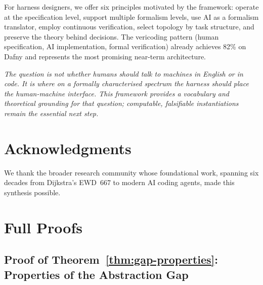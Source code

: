 \documentclass[11pt, a4paper, copyright]{googledeepmind}
\begin{document}
For harness designers, we offer six principles motivated by the framework: operate at the specification level, support multiple formalism levels, use AI as a formalism translator, employ continuous verification, select topology by task structure, and preserve the theory behind decisions. The vericoding pattern (human specification, AI implementation, formal verification) already achieves 82\% on Dafny and represents the most promising near-term architecture.

\emph{The question is not whether humans should talk to machines in English or in code. It is where on a formally characterised spectrum the harness should place the human-machine interface. This framework provides a vocabulary and theoretical grounding for that question; computable, falsifiable instantiations remain the essential next step.}


\section*{Acknowledgments}

We thank the broader research community whose foundational work, spanning six decades from Dijkstra's EWD~667 to modern AI coding agents, made this synthesis possible.









\clearpage


\appendix

\section{Full Proofs}
\label{app:proofs}

\subsection{Proof of Theorem~\ref{thm:gap-properties}: Properties of the Abstraction Gap}
\end{document}
